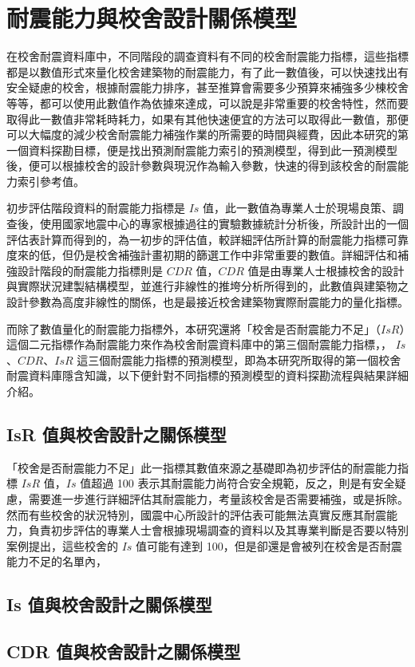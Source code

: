 \renewcommand\thetable{\arabic{chapter}-\arabic{table}}
\chapter{耐震能力與校舍設計關係模型}

在校舍耐震資料庫中，不同階段的調查資料有不同的校舍耐震能力指標，這些指標都是以數值形式來量化校舍建築物的耐震能力，有了此一數值後，可以快速找出有安全疑慮的校舍，根據耐震能力排序，甚至推算會需要多少預算來補強多少棟校舍等等，都可以使用此數值作為依據來達成，可以說是非常重要的校舍特性，然而要取得此一數值非常耗時耗力，如果有其他快速便宜的方法可以取得此一數值，那便可以大幅度的減少校舍耐震能力補強作業的所需要的時間與經費，因此本研究的第一個資料探勘目標，便是找出預測耐震能力索引的預測模型，得到此一預測模型後，便可以根據校舍的設計參數與現況作為輸入參數，快速的得到該校舍的耐震能力索引參考值。

初步評估階段資料的耐震能力指標是 $Is$ 值，此一數值為專業人士於現場良策、調查後，使用國家地震中心的專家根據過往的實驗數據統計分析後，所設計出的一個評估表計算而得到的，為一初步的評估值，較詳細評估所計算的耐震能力指標可靠度來的低，但仍是校舍補強計畫初期的篩選工作中非常重要的數值。詳細評估和補強設計階段的耐震能力指標則是 $CDR$ 值，$CDR$ 值是由專業人士根據校舍的設計與實際狀況建製結構模型，並進行非線性的推垮分析所得到的，此數值與建築物之設計參數為高度非線性的關係，也是最接近校舍建築物實際耐震能力的量化指標。

而除了數值量化的耐震能力指標外，本研究還將「校舍是否耐震能力不足」（$IsR$）這個二元指標作為耐震能力來作為校舍耐震資料庫中的第三個耐震能力指標，， $Is$、$CDR$、$IsR$ 這三個耐震能力指標的預測模型，即為本研究所取得的第一個校舍耐震資料庫隱含知識，以下便針對不同指標的預測模型的資料探勘流程與結果詳細介紹。

\section{IsR 值與校舍設計之關係模型}

「校舍是否耐震能力不足」此一指標其數值來源之基礎即為初步評估的耐震能力指標 $IsR$ 值，$Is$ 值超過 100 表示其耐震能力尚符合安全規範，反之，則是有安全疑慮，需要進一步進行詳細評估其耐震能力，考量該校舍是否需要補強，或是拆除。然而有些校舍的狀況特別，國震中心所設計的評估表可能無法真實反應其耐震能力，負責初步評估的專業人士會根據現場調查的資料以及其專業判斷是否要以特別案例提出，這些校舍的 $Is$ 值可能有達到 100，但是卻還是會被列在校舍是否耐震能力不足的名單內，

\section{Is 值與校舍設計之關係模型}


\section{CDR 值與校舍設計之關係模型}

